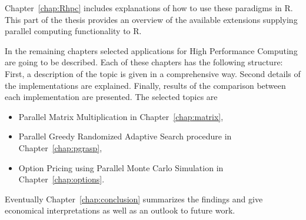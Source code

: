 Chapter~\ref{chap:Rhpc} includes explanations of how to use these
paradigms in R. This part of
the thesis provides an overview of the
available extensions supplying parallel computing functionality to R.

In the remaining chapters selected applications for High Performance
Computing are going to be
described. Each of these chapters has the following structure: First,
a description of the topic is given in a comprehensive way. Second
details of the implementations are explained. Finally, results of the
comparison between each implementation are presented. The selected
topics are
\begin{itemize}
\item Parallel Matrix Multiplication in Chapter~\ref{chap:matrix},
\item Parallel Greedy Randomized Adaptive Search procedure in
  Chapter~\ref{chap:pgrasp},
\item Option Pricing using Parallel Monte Carlo Simulation in
  Chapter~\ref{chap:options}. 
\end{itemize}
Eventually Chapter~\ref{chap:conclusion} summarizes
the findings and give economical interpretations as well as an outlook
to future work.
